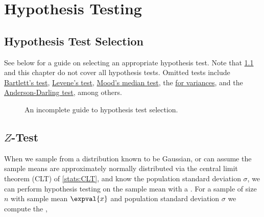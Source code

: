\chapter{Hypothesis Testing}
\label{chap:hypo}

\section{Hypothesis Test Selection}
\label{hypo:test_selection}

See below for a guide on selecting an appropriate hypothesis test.
Note that \cref{fig:hypo_test_decision_tree} and this chapter
do not cover all hypothesis tests.
Omitted tests include
\href{https://en.wikipedia.org/wiki/Bartlett's_test}{Bartlett's test},
\href{https://en.wikipedia.org/wiki/Levene's_test}{Levene's test},
\href{https://en.wikipedia.org/wiki/Median_test}{Mood's median test},
the \href{https://en.wikipedia.org/wiki/Chi-squared_test\#Chi-squared_test_for_variance_in_a_normal_population}{\chiSqtest for variances},
and the \href{https://en.wikipedia.org/wiki/Anderson-Darling_test}{Anderson-Darling test},
among others.

\begin{figure}[H]
\centering

\caption{
An incomplete guide to hypothesis test selection.
}
\label{fig:hypo_test_decision_tree}
\end{figure}

\clearpage %

\section{\texorpdfstring{$Z$}{Z}-Test}
\label{hypo:Z_test}

When we sample from a distribution known to be Gaussian,
or can assume the sample means are approximately normally distributed via the central limit theorem (CLT) of \cref{stats:CLT},
and know the population standard deviation $\sigma$,
we can perform hypothesis testing on the sample mean with a \Ztest.
For a sample of size $n$ with sample mean $\expval{x}$ and population standard deviation $\sigma$
we compute the \Zscore,

